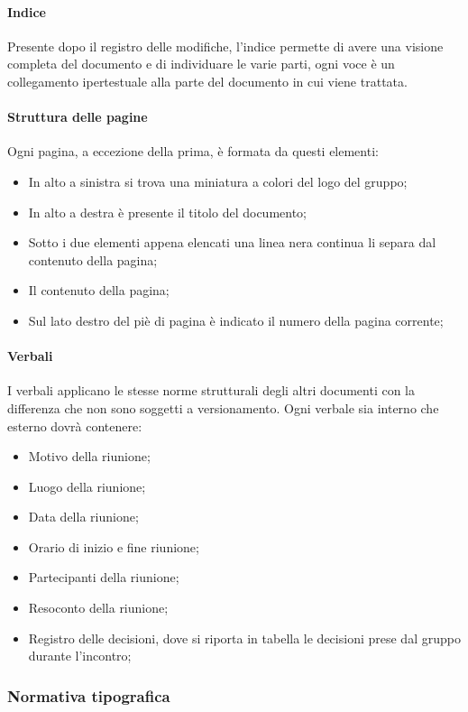 \paragraph{Indice}
Presente dopo il registro delle modifiche, l’indice permette di avere una visione completa del documento e di individuare le varie parti, ogni voce è un collegamento ipertestuale alla parte del documento in cui viene trattata.

\paragraph{Struttura delle pagine}
Ogni pagina, a eccezione della prima, è formata da questi elementi:
  \begin{itemize}
  		\item In alto a sinistra si trova una miniatura a colori del logo del gruppo;
  		\item In alto a destra è presente il titolo del documento;
  		\item Sotto i due elementi appena elencati una linea nera continua li separa dal contenuto della pagina;
  		\item Il contenuto della pagina;
  		\item Sul lato destro del piè di pagina è indicato il numero della pagina corrente;
	\end{itemize}
	
\paragraph{Verbali}
I verbali applicano le stesse norme strutturali degli altri documenti con la differenza che non sono soggetti a versionamento. Ogni verbale sia interno che esterno dovrà contenere:
\begin{itemize}
\item Motivo della riunione;
\item Luogo della riunione;
\item Data della riunione;
\item Orario di inizio e fine riunione;
\item Partecipanti della riunione;
\item Resoconto della riunione;
\item Registro delle decisioni, dove si riporta in tabella le decisioni prese dal gruppo durante l’incontro;
\end{itemize}  		

\subsubsection{Normativa tipografica}
